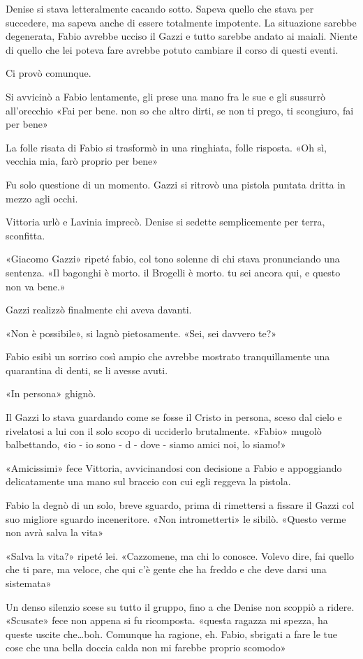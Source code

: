 Denise si stava letteralmente cacando sotto. Sapeva quello che stava per succedere, ma sapeva anche di essere totalmente impotente. La situazione sarebbe degenerata, Fabio avrebbe ucciso il Gazzi e tutto sarebbe andato ai maiali. Niente di quello che lei poteva fare avrebbe potuto cambiare il corso di questi eventi.

Ci provò comunque.

Si avvicinò a Fabio lentamente, gli prese una mano fra le sue e gli sussurrò all'orecchio «Fai per bene. non so che altro dirti, se non ti prego, ti scongiuro, fai per bene»

La folle risata di Fabio si trasformò in una ringhiata, folle risposta. «Oh sì, vecchia mia, farò proprio per bene»

Fu solo questione di un momento. Gazzi si ritrovò una pistola puntata dritta in mezzo agli occhi.

Vittoria urlò e Lavinia imprecò. Denise si sedette semplicemente per terra, sconfitta. 

«Giacomo Gazzi» ripeté fabio, col tono solenne di chi stava pronunciando una sentenza. «Il bagonghi è morto. il Brogelli è morto. tu sei ancora qui, e questo non va bene.» 

Gazzi realizzò finalmente chi aveva davanti.

«Non è possibile», si lagnò pietosamente. «Sei, sei davvero te?»

Fabio esibì un sorriso così ampio che avrebbe mostrato tranquillamente una quarantina di denti, se li avesse avuti.

«In persona» ghignò.

Il Gazzi lo stava guardando come se fosse il Cristo in persona, sceso dal cielo e rivelatosi a lui con il solo scopo di ucciderlo brutalmente. «Fabio» mugolò balbettando, «io - io sono - d - dove - siamo amici noi, lo siamo!»

«Amicissimi» fece Vittoria, avvicinandosi con decisione a Fabio e appoggiando delicatamente una mano sul braccio con cui egli reggeva la pistola.

Fabio la degnò di un solo, breve sguardo, prima di rimettersi a fissare il Gazzi col suo migliore sguardo inceneritore. «Non intrometterti» le sibilò. «Questo verme non avrà salva la vita»

«Salva la vita?» ripeté lei. «Cazzomene, ma chi lo conosce. Volevo dire, fai quello che ti pare, ma veloce, che qui c'è gente che ha freddo e che deve darsi una sistemata»

Un denso silenzio scese su tutto il gruppo, fino a che Denise non scoppiò a ridere. «Scusate» fece non appena si fu ricomposta. «questa ragazza mi spezza, ha queste uscite che\ldots boh. Comunque ha ragione, eh. Fabio, sbrigati a fare le tue cose che una bella doccia calda non mi farebbe proprio scomodo»

